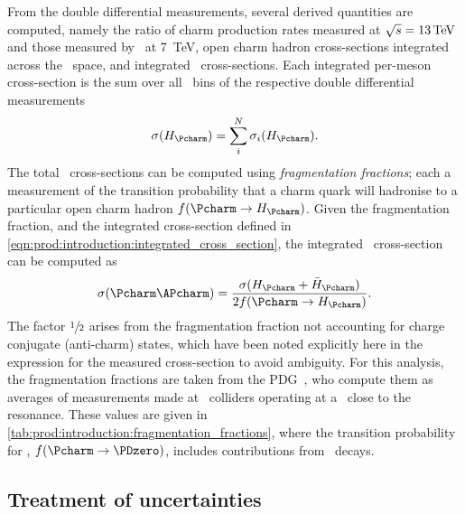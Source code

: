 From the double differential measurements, several derived quantities are 
computed, namely the ratio of charm production rates measured at $\sqrts = 
\SI{13}{\TeV}$ and those measured by \lhcb\ at \SI{7}{\TeV}, open charm hadron 
cross-sections integrated across the \pTy\ space, and integrated \ccbar\ 
cross-sections.
Each integrated per-meson cross-section is the sum over all \pTy\ bins of the 
respective double differential measurements
\begin{equation}
  \xsec{(\PHc)} =
    \sum_{i}^{N} \xsec_{i}(\PHc).
  \label{eqn:prod:introduction:integrated_cross_section}
\end{equation}
The total \ccbar\ cross-sections can be computed using \emph{fragmentation 
  fractions}; each a measurement of the transition probability that a charm 
quark will hadronise to a particular open charm hadron $f(\cToHc)$.
Given the fragmentation fraction, and the integrated cross-section defined in 
\cref{eqn:prod:introduction:integrated_cross_section}, the integrated \ccbar\ 
cross-section can be computed as
\begin{equation}
  \xsec{(\ccbar)} = \frac{\xsec(\PHc + \APHc)}{2f(\cToHc)}.
  \label{eqn:prod:introduction:ccbar_cross_section}
\end{equation}
The factor $\sfrac{1}{2}$ arises from the fragmentation fraction not accounting 
for charge conjugate (anti-charm) states, which have been noted explicitly here 
in the expression for the measured cross-section to avoid ambiguity.
For this analysis, the fragmentation fractions are taken from the 
\ac{PDG}~\cite{PDG2008}, who compute them as averages of measurements made at 
\epem\ colliders operating at a \sqrts\ close to the \PUpsilonFourS resonance.
These values are given in \cref{tab:prod:introduction:fragmentation_fractions}, 
where the transition probability for \PDzero, $f(\decay{\Pcharm}{\PDzero})$, 
includes contributions from \DstToDzpi\ decays.

\begin{table}
  \caption[Charm hadron fragmentation fractions]{%
    Charm hadron fragmentation fractions~\cite{PDG2008}.
    Here, \PHc\ does not include the charge conjugate state.
  }
  \label{tab:prod:introduction:fragmentation_fractions}
  \centering
  
\end{table}

\subsection{Treatment of uncertainties}
\label{chap:prod:introduction:uncertainties}

